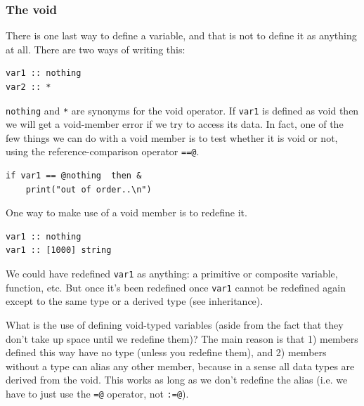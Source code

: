 \documentclass{article}
\newenvironment{code}{
       \begin{list}{}{
               \setlength{\leftmargin}{.4in}
               \setlength{\rightmargin}{0in}
               \setlength{\topsep}{.2in}
       }
       \small
       \item[] }
       { \end{list}   }
\begin{document}
\subsubsection{The void}

There is one last way to define a variable, and that is not to define it as anything at all.  There are two ways of writing this:

\begin{code} \begin{verbatim}
var1 :: nothing
var2 :: *
\end{verbatim} \end{code}

\noindent \verb#nothing# and \verb#*# are synonyms for the void operator.  If \verb#var1# is defined as void then we will get a void-member error if we try to access its data.  In fact, one of the few things we can do with a void member is to test whether it is void or not, using the reference-comparison operator \verb#==@#.

\begin{code} \begin{verbatim}
if var1 == @nothing  then &
    print("out of order..\n")
\end{verbatim} \end{code}

One way to make use of a void member is to redefine it.

\begin{code} \begin{verbatim}
var1 :: nothing
var1 :: [1000] string
\end{verbatim} \end{code}

\noindent We could have redefined \verb#var1# as anything:  a primitive or composite variable, function, etc.  But once it's been redefined once \verb#var1# cannot be redefined again except to the same type or a derived type (see inheritance).

What is the use of defining void-typed variables (aside from the fact that they don't take up space until we redefine them)?  The main reason is that 1) members defined this way have no type (unless you redefine them), and 2) members without a type can alias any other member, because in a sense all data types are derived from the void.  This works as long as we don't redefine the alias (i.e. we have to just use the \verb#=@# operator, not \verb#:=@#).
\end{document}
